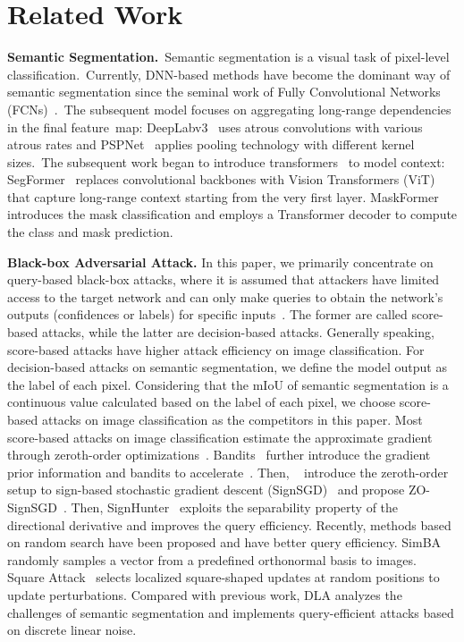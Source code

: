 \documentclass[10pt,twocolumn,letterpaper]{article}
\begin{document}
\section{Related Work}
\label{sec:relatedwork}

\textbf{Semantic Segmentation.}~Semantic segmentation is a visual task of pixel-level classification.~Currently, DNN-based methods have become the dominant way of semantic segmentation since the seminal work of Fully Convolutional Networks (FCNs)~\cite{fcn}.~The subsequent model focuses on aggregating long-range dependencies in the final feature~map: DeepLabv3~\cite{deeplabv3} uses atrous convolutions with various atrous rates and PSPNet~\cite{pspnet} applies pooling technology with different kernel sizes.~The subsequent work began to introduce transformers~\cite{transformer} to model context: SegFormer~\cite{segformer} replaces convolutional backbones with Vision Transformers (ViT)~\cite{vit} that capture long-range context starting from the very first layer. MaskFormer~\cite{maskformer} introduces the mask classification and employs a Transformer decoder to compute the class and mask prediction.

\noindent\textbf{Black-box Adversarial Attack. }
In this paper, we primarily concentrate on query-based black-box attacks, where it is assumed that attackers have limited access to the target network and can only make queries to obtain the network's outputs (confidences or labels) for specific inputs~\cite{qeba,devopatch}. The former are called score-based attacks, while the latter are decision-based attacks. Generally speaking, score-based attacks have higher attack efficiency on image classification. For decision-based attacks on semantic segmentation, we define the model output as the label of each pixel. Considering that the mIoU of semantic segmentation is a continuous value calculated based on the label of each pixel, we choose score-based attacks on image classification as the competitors in this paper. Most score-based attacks on image classification estimate the approximate gradient through zeroth-order optimizations~\cite{nes}. Bandits~\cite{bandits} further introduce the gradient prior information and bandits to accelerate~\cite{nes}. Then, \citeauthor{zosignpgd}~\cite{zosignpgd} introduce the zeroth-order setup to sign-based stochastic gradient descent (SignSGD)~\cite{signpgd} and propose ZO-SignSGD~\cite{zosignpgd}. Then, SignHunter~\cite{signhunter} exploits the separability property of the directional derivative and improves the query efficiency.
Recently, methods based on random search have been proposed and have better query efficiency. SimBA~\cite{simba} randomly samples a vector from a predefined orthonormal basis to images. Square Attack~\cite{square} selects localized square-shaped updates at random positions to update perturbations. 
Compared with previous work, DLA analyzes the challenges of semantic segmentation and implements query-efficient attacks based on discrete linear noise.
\end{document}
